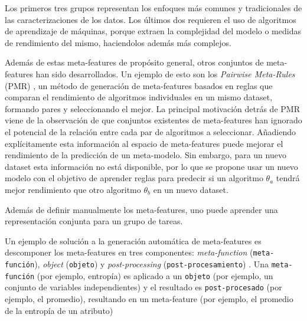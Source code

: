 Los primeros tres grupos representan los enfoques más comunes y tradicionales de las caracterizaciones de los datos. Los últimos dos requieren el uso de algoritmos de aprendizaje de máquinas, porque extraen la complejidad del modelo o medidas de rendimiento del mismo, haciendolos además más complejos.

Además de estas meta-features de propósito general, otros conjuntos de meta-features han sido desarrollados. Un ejemplo de esto son los \textit{Pairwise Meta-Rules} (PMR) \cite{sun2013pairwise}, un método de generación de meta-features basados en reglas que comparan el rendimiento de algoritmos individuales en un mismo dataset, formando pares y seleccionando el mejor. La principal motivación detrás de PMR viene de la observación de que conjuntos existentes de meta-features han ignorado el potencial de la relación entre cada par de algoritmos a seleccionar. Añadiendo explícitamente esta información al espacio de meta-features puede mejorar el rendimiento de la predicción de un meta-modelo. Sin embargo, para un nuevo dataset esta información no está disponible, por lo que se propone usar un nuevo modelo con el objetivo de aprender reglas para predecir si un algoritmo $\theta_a$ tendrá mejor rendimiento que otro algoritmo $\theta_b$ en un nuevo dataset.

Además de definir manualmente los meta-features, uno puede aprender una representación conjunta para un grupo de tareas. 

Un ejemplo de solución a la generación automática de meta-features es descomponer los meta-features en tres componentes: \textit{meta-function} (\texttt{meta-función}), \textit{object} (\texttt{objeto}) y \textit{post-processing} (\texttt{post-procesamiento}) \cite{Pinto2016TowardsAG, pinto2014framework}. Una \texttt{meta-función} (por ejemplo, entropía) es aplicado a un \texttt{objeto} (por ejemplo, un conjunto de variables independientes) y el resultado es \texttt{post-procesado} (por ejemplo, el promedio), resultando en un meta-feature (por ejemplo, el promedio de la entropía de un atributo) %

